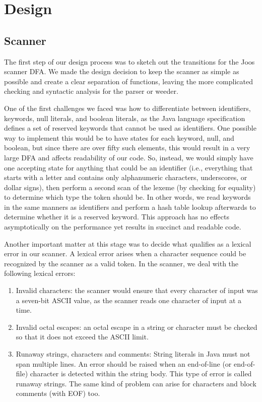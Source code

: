\chapter{Design}
\label{design}

\section{Scanner}
\label{scanner_design}
The first step of our design process was to sketch out the transitions for the Joos scanner DFA. We made the design decision to keep the scanner as simple as possible and create a clear separation of functions, leaving the more complicated checking and syntactic analysis for the parser or weeder. 

One of the first challenges we faced was how to differentiate between identifiers, keywords, null literals, and boolean literals, as the Java language specification defines a set of reserved keywords that cannot be used as identifiers. One possible way to implement this would be to have states for each keyword, null, and boolean,
  but since there are over fifty such elements, this would result in a very large DFA and affects readability of our code.
So, instead, we would simply have one accepting state for anything that could be an identifier
  (i.e., everything that starts with a letter and contains only alphanumeric characters, underscores, or dollar signs),
  then perform a second scan of the lexeme (by checking for equality) to determine which type the token should be. In other words, we read keywords in the same manners as identifiers and perform a hash table lookup afterwards to determine whether it is a reserved keyword. This approach has no effects asymptotically on the performance yet results in succinct and readable code.

Another important matter at this stage was to decide what qualifies as a lexical error in our scanner. A lexical error arises when a character sequence could be recognized by the scanner as a valid token. In the scanner, we deal with the following lexical errors:
\begin{enumerate}
	\item Invalid characters: the scanner would ensure that every character of input was a seven-bit ASCII value,
  as the scanner reads one character of input at a time.
	\item Invalid octal escapes: an octal escape in a string or character must be checked so that it does not exceed the ASCII limit. 
	\item Runaway strings, characters and comments: String literals in Java must not span multiple lines. An error should be raised when an end-of-line (or end-of-file) character is detected within the string body. This type of error is called runaway strings. The same kind of problem can arise for characters and block comments (with EOF) too. 
\end{enumerate}

